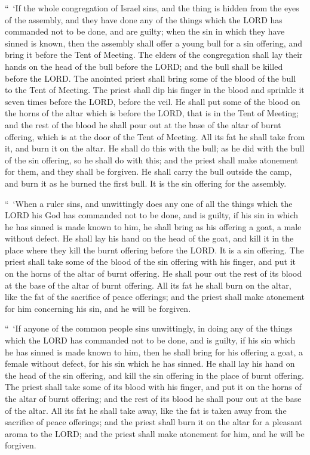 \myverse{}“ ‘If the whole congregation of Israel sins, and the thing is
hidden from the eyes of the assembly, and they have done any of the things which the LORD has commanded
not to be done, and are guilty;
\myverse{}when the sin in which they have sinned is known, then the assembly shall offer
a young bull for a sin offering, and bring it before the Tent of Meeting.
\myverse{}The elders of the congregation shall lay their hands on the head of the bull
before the LORD; and the bull shall be killed before the LORD.
\myverse{}The anointed priest shall bring some of the blood of the bull to the Tent
of Meeting.
\myverse{}The priest shall dip his finger in the blood and sprinkle it seven times before
the LORD, before the veil.
\myverse{}He shall put some of the blood on the horns of the altar which is before the
LORD, that is in the Tent of Meeting; and the rest of the blood he shall pour out at the base of the altar
of burnt offering, which is at the door of the Tent of Meeting.
\myverse{}All its fat he shall take from it, and burn it on the altar.
\myverse{}He shall do this with the bull; as he did with the bull of the sin offering,
so he shall do with this; and the priest shall make atonement for them, and they shall be forgiven.
\myverse{}He shall carry the bull outside the camp, and burn it as he burned the first
bull. It is the sin offering for the assembly.


\myverse{}“ ‘When a ruler sins, and unwittingly does any one of all the
things which the LORD his God has commanded not to be done, and is guilty,
\myverse{}if his sin in which he has sinned is made known to him, he shall bring as
his offering a goat, a male without defect.
\myverse{}He shall lay his hand on the head of the goat, and kill it in the place where
they kill the burnt offering before the LORD. It is a sin offering.
\myverse{}The priest shall take some of the blood of the sin offering with his finger,
and put it on the horns of the altar of burnt offering. He shall pour out the rest of its blood at the
base of the altar of burnt offering.
\myverse{}All its fat he shall burn on the altar, like the fat of the sacrifice of peace
offerings; and the priest shall make atonement for him concerning his sin, and he will be forgiven.


\myverse{}“ ‘If anyone of the common people sins unwittingly, in doing any
of the things which the LORD has commanded not to be done, and is guilty,
\myverse{}if his sin which he has sinned is made known to him, then he shall bring for
his offering a goat, a female without defect, for his sin which he has sinned.
\myverse{}He shall lay his hand on the head of the sin offering, and kill the sin offering
in the place of burnt offering.
\myverse{}The priest shall take some of its blood with his finger, and put it on the
horns of the altar of burnt offering; and the rest of its blood he shall pour out at the base of the altar.
\myverse{}All its fat he shall take away, like the fat is taken away from the sacrifice
of peace offerings; and the priest shall burn it on the altar for a pleasant aroma to the LORD; and the
priest shall make atonement for him, and he will be forgiven.


